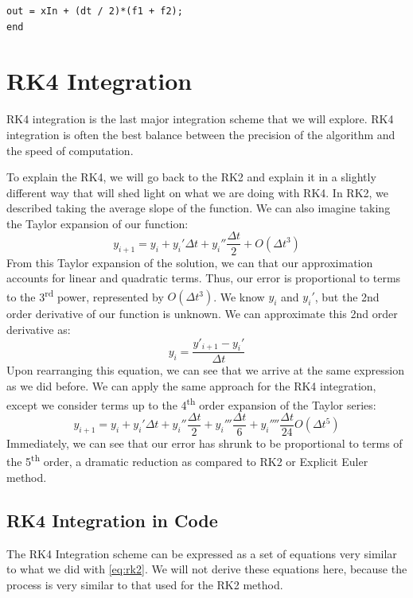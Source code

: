 \documentclass[12pt]{report}
\begin{document}
{\begin{lstlisting}[style=Matlab-editor, caption=RK2 Integrator]
    out = xIn + (dt / 2)*(f1 + f2);
end
\end{lstlisting}\label{code:rk2}

\section{RK4 Integration}
RK4 integration is the last major integration scheme that we will explore. RK4 integration is often the best balance between the precision of the algorithm and the speed of computation. 

To explain the RK4, we will go back to the RK2 and explain it in a slightly different way that will shed light on what we are doing with RK4. In RK2, we described taking the average slope of the function. We can also imagine taking the Taylor expansion of our function:
$$y_{i+1}=y_i+y_i'\Delta t+y_i''\frac{\Delta t}{2}+O\left(\Delta t^3\right)$$
From this Taylor expansion of the solution, we can that our approximation accounts for linear and quadratic terms. Thus, our error is proportional to terms to the 3\textsuperscript{rd} power, represented by $O(\Delta t^3)$. We know $y_i$ and $y_i'$, but the 2nd order derivative of our function is unknown. We can approximate this 2nd order derivative as:
$$y_i=\frac{y'_{i+1}-y_i'}{\Delta t}$$
Upon rearranging this equation, we can see that we arrive at the same expression as we did before. We can apply the same approach for the RK4 integration, except we consider terms up to the 4\textsuperscript{th} order expansion of the Taylor series:
$$y_{i+1}=y_i+y_i'\Delta t+y_i''\frac{\Delta t}{2}+y_i'''\frac{\Delta t}{6}+y_i''''\frac{\Delta t}{24}O\left(\Delta t^5\right)$$
Immediately, we can see that our error has shrunk to be proportional to terms of the 5\textsuperscript{th} order, a dramatic reduction as compared to RK2 or Explicit Euler method.

\subsection{RK4 Integration in Code}
The RK4 Integration scheme can be expressed as a set of equations very similar to what we did with \eqref{eq:rk2}. We will not derive these equations here, because the process is very similar to that used for the RK2 method.

}
\end{document}
